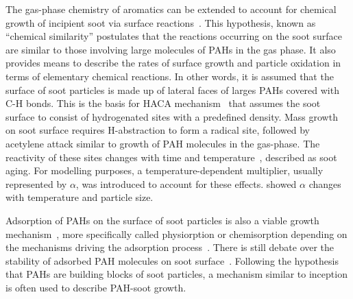 The gas-phase chemistry of aromatics can be extended to account for chemical growth of incipient soot via surface reactions~\citep{frenklach2002reaction}. This hypothesis, known as “chemical similarity” postulates that the reactions occurring on the soot surface are similar to those involving large molecules of PAHs in the gas phase. It also provides means to describe the rates of surface growth and particle oxidation in
terms of elementary chemical reactions. In other words, it is assumed that the surface of soot particles is made up of lateral faces of larges PAHs covered with C-H bonds.
This is the basis for HACA mechanism~\citep{frenklach1991detailed, appel2000kinetic}  that assumes the soot surface to consist of hydrogenated sites with a predefined density. Mass growth on soot surface requires H-abstraction to form a radical
site, followed by acetylene attack similar to growth of PAH molecules in the gas-phase. The reactivity of these sites changes with time and temperature~\citep{woods1991soot, dasch1985decay}, described as soot aging. For modelling purposes, a temperature-dependent multiplier, usually represented by $\alpha$, was introduced to account for these effects. \citet{appel2000kinetic} showed $\alpha$ changes with temperature and particle size.


Adsorption of PAHs on the surface of soot particles is also a viable growth mechanism~\citep{frenklach1991detailed}, more specifically called physiorption or chemisorption depending on the mechanisms driving the adsorption process~\citep{michelsen2020review}. There is still debate over the stability of adsorbed PAH molecules on soot surface~\citep{obolensky2007interplay}. Following the hypothesis that PAHs are building blocks of soot particles, a mechanism similar to inception is often used to describe  PAH-soot growth.


